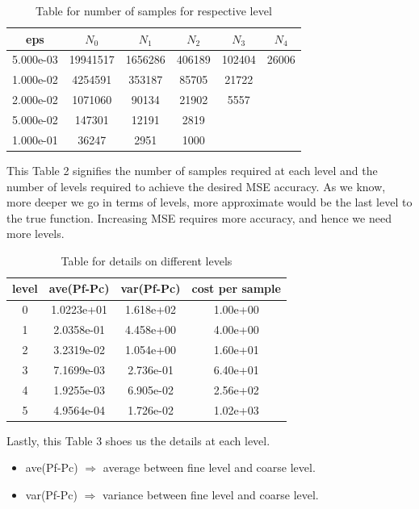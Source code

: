 \documentclass[12pt]{article}
\begin{document}
\begin{table}[h!]
\begin{center}
\caption{Table for number of samples for respective level}
\begin{tabular}{||c c c c c c||} 
 \hline
 eps & $N_0$ & $N_1$ & $N_2$ & $N_3$ & $N_4$\\ [0.5ex] 
 \hline\hline
 5.000e-03 & 19941517  & 1656286   & 406189  &  102404  &   26006\\ 
 \hline
 1.000e-02 & 4254591  &  353187    & 85705  &   21722 & \\
 \hline
 2.000e-02 & 1071060  &   90134    & 21902   &   5557 & \\
 \hline
 5.000e-02 & 147301   &  12191     & 2819 & &\\
 \hline
 1.000e-01 & 36247   &   2951     & 1000 & &\\ [1ex] 
 \hline
\end{tabular}
\end{center}
\end{table}
This Table 2 signifies the number of samples required at each level and the number of levels required to achieve the desired MSE accuracy. As we know, more deeper we go in terms of levels, more approximate would be the last level to the true function. Increasing MSE requires more accuracy, and hence we need more levels.

\begin{table}[h!]
\begin{center}
\caption{Table for details on different levels}
\begin{tabular}{||c c c c||} 
 \hline
 level & ave(Pf-Pc) & var(Pf-Pc) & cost per sample \\ [0.5ex] 
 \hline\hline
 0 &  1.0223e+01 & 1.618e+02 & 1.00e+00\\ 
 \hline
 1  &  2.0358e-01  & 4.458e+00  & 4.00e+00  \\
 \hline
 2 &  3.2319e-02 &  1.054e+00  & 1.60e+01  \\
 \hline
 3 & 7.1699e-03 & 2.736e-01 &  6.40e+01 \\
 \hline
 4 &  1.9255e-03 & 6.905e-02 & 2.56e+02\\
 \hline
 5 &  4.9564e-04 & 1.726e-02 &  1.02e+03 \\ [1ex] 
 \hline
\end{tabular}
\end{center}
\end{table}
Lastly, this Table 3 shoes us the details at each level. 
\begin{itemize}
\item ave(Pf-Pc) $\Rightarrow$ average between fine level and coarse level.
\item var(Pf-Pc) $\Rightarrow$ variance between fine level and coarse level.
\end{itemize}
\end{document}
